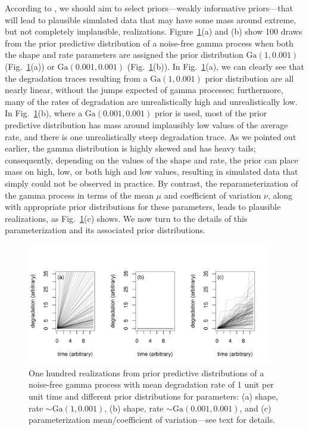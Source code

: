 \documentclass{article}
\begin{document}
According to \citet{gabry_vis_2019}, we should aim to select priors---weakly informative priors---that will lead to plausible simulated data that may have some mass around extreme, but not completely implausible, realizations. Figure~\ref{fig:ppc}(a) and (b) show 100 draws from the prior predictive distribution of a noise-free gamma process when both the shape and rate parameters are assigned the prior distribution $\mbox{Ga}(1, 0.001)$ (Fig.~\ref{fig:ppc}(a)) or $\mbox{Ga}(0.001, 0.001)$ (Fig.~\ref{fig:ppc}(b)). In Fig.~\ref{fig:ppc}(a), we can clearly see that the degradation traces resulting from a $\mbox{Ga}(1, 0.001)$ prior distribution are all nearly linear, without the jumps expected of gamma processes; furthermore, many of the rates of degradation are unrealistically high and unrealistically low. In Fig.~\ref{fig:ppc}(b), where a $\mbox{Ga}(0.001, 0.001)$ prior is used, most of the prior predictive distribution has mass around implausibly low values of the average rate, and there is one unrealistically steep degradation trace. As we pointed out earlier, the gamma distribution is highly skewed and has heavy tails; consequently, depending on the values of the shape and rate, the prior can place mass on high, low, or both high and low values, resulting in simulated data that simply could not be observed in practice.  By contrast, the reparameterization of the gamma process in terms of the mean $\mu$ and coefficient of variation $\nu$, along with appropriate prior distributions for these parameters, leads to plausible realizations, as Fig.~\ref{fig:ppc}(c) shows. We now turn to the details of this parameterization and its associated prior distributions.

\begin{figure} %
    \centering
    \includegraphics[width=0.95\textwidth]{../figures/PPC.pdf}
    \caption{One hundred realizations from prior predictive distributions of a noise-free gamma process with mean degradation rate of 1 unit per unit time and different prior distributions for parameters: (a) shape, rate $\sim \mbox{Ga}(1, 0.001)$, (b) shape, rate $\sim \mbox{Ga}(0.001, 0.001)$, and (c) parameterization mean/coefficient of variation---see text for details.}
  \label{fig:ppc}
\end{figure}
\end{document}
